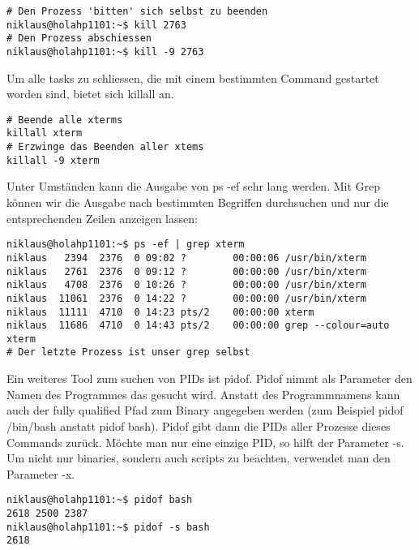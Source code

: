 \documentclass[10pt,paper=a4,final]{scrartcl}
\begin{document}
\begin{lstlisting}[frame=single]
# Den Prozess 'bitten' sich selbst zu beenden
niklaus@holahp1101:~$ kill 2763
# Den Prozess abschiessen
niklaus@holahp1101:~$ kill -9 2763
\end{lstlisting}
Um alle tasks zu schliessen, die mit einem bestimmten Command gestartet worden sind, bietet sich killall an.
\begin{lstlisting}[frame=single]
# Beende alle xterms
killall xterm
# Erzwinge das Beenden aller xtems
killall -9 xterm
\end{lstlisting}
Unter Umst\"anden kann die Ausgabe von ps -ef sehr lang werden. Mit Grep k\"onnen wir die Ausgabe nach bestimmten Begriffen durchsuchen und nur die entsprechenden Zeilen anzeigen lassen:
\begin{lstlisting}[frame=single]
niklaus@holahp1101:~$ ps -ef | grep xterm
niklaus   2394  2376  0 09:02 ?        00:00:06 /usr/bin/xterm
niklaus   2761  2376  0 09:12 ?        00:00:00 /usr/bin/xterm
niklaus   4708  2376  0 10:26 ?        00:00:00 /usr/bin/xterm
niklaus  11061  2376  0 14:22 ?        00:00:00 /usr/bin/xterm
niklaus  11111  4710  0 14:23 pts/2    00:00:00 xterm
niklaus  11686  4710  0 14:43 pts/2    00:00:00 grep --colour=auto xterm
# Der letzte Prozess ist unser grep selbst
\end{lstlisting}
Ein weiteres Tool zum suchen von PIDs ist pidof. Pidof nimmt als Parameter den Namen des Programmes das gesucht wird. Anstatt des Programmnamens kann auch der fully qualified Pfad zum Binary angegeben werden (zum Beispiel pidof /bin/bash anstatt pidof bash). Pidof gibt dann die PIDs aller Prozesse dieses Commands zur\"uck. M\"ochte man nur eine einzige PID, so hilft der Parameter -s. Um nicht nur binaries, sondern auch scripts zu beachten, verwendet man den Parameter -x.
\begin{lstlisting}[frame=single]
niklaus@holahp1101:~$ pidof bash
2618 2500 2387
niklaus@holahp1101:~$ pidof -s bash
2618
\end{lstlisting}
\end{document}
